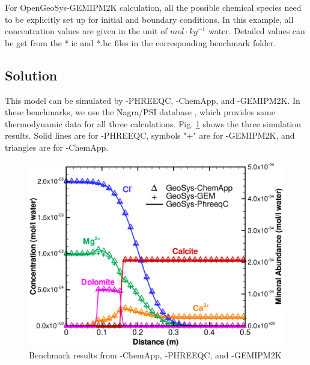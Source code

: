 For OpenGeoSys-GEMIPM2K calculation, all the possible chemical species
need to be explicitly set up for initial and boundary conditions. In
this example, all concentration values are given in the unit of
$mol \cdot kg^{-1}$ water. Detailed values can be get from the *.ic and *.bc files in the corresponding benchmark folder.

\subsection{Solution}
This model can be simulated by \GeoSys-PHREEQC, \GeoSys-ChemApp, and
\GeoSys-GEMIPM2K. In these benchmarks, we use the Nagra/PSI
database \cite{PSI_Database:02}, which provides same thermodynamic
data for all three calculations. Fig. \ref{c:cal_rst}
shows the three simulation results. Solid lines are for \GeoSys-PHREEQC,
symbols "+" are for \GeoSys-GEMIPM2K, and triangles are for \GeoSys-ChemApp.

\begin{figure}[!htb]
  \begin{center}
    \includegraphics[scale=0.3]{PART_III/HC/calcite_result.eps}
  \end{center}
  \caption{Benchmark results from \GeoSys-ChemApp, \GeoSys-PHREEQC, and \GeoSys-GEMIPM2K}
  \label{c:cal_rst}
\end{figure}
